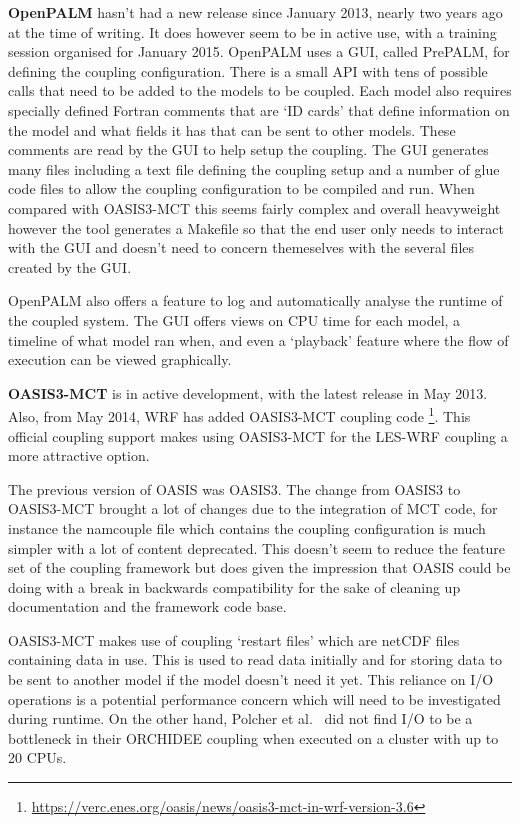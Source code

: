 \documentclass{acm_proc_article-sp}
\renewcommand{\_}{\underscore\hspace{0pt}}
\begin{document}
\textbf{OpenPALM} hasn't had a new release since January 2013, nearly two years
ago at the time of writing. It does however seem to be in active use, with a
training session organised for January 2015. OpenPALM uses a GUI, called
PrePALM, for defining the coupling configuration. There is a small API with tens
of possible calls that need to be added to the models to be coupled. Each model
also requires specially defined Fortran comments that are `ID cards' that define
information on the model and what fields it has that can be sent to other
models. These comments are read by the GUI to help setup the coupling. The GUI
generates many files including a text file defining the coupling setup and a
number of glue code files to allow the coupling configuration to be compiled and
run. When compared with OASIS3-MCT this seems fairly complex and overall
heavyweight however the tool generates a Makefile so that the end user only
needs to interact with the GUI and doesn't need to concern themeselves with the
several files created by the GUI.

OpenPALM also offers a feature to log and automatically analyse the runtime of
the coupled system. The GUI offers views on CPU time for each model, a timeline
of what model ran when, and even a `playback' feature where the flow of
execution can be viewed graphically.

\textbf{OASIS3-MCT} is in active development, with the latest release in May
2013. Also, from May 2014, WRF has added OASIS3-MCT coupling code
\footnote{\url{https://verc.enes.org/oasis/news/oasis3-mct-in-wrf-version-3.6}}.
This official coupling support makes using OASIS3-MCT for the LES-WRF coupling a
more attractive option.

The previous version of OASIS was OASIS3. The change from OASIS3 to OASIS3-MCT
brought a lot of changes due to the integration of MCT code, for instance the
namcouple file which contains the coupling configuration is much simpler with a
lot of content deprecated. This doesn't seem to reduce the feature set of the
coupling framework but does given the impression that OASIS could be doing with
a break in backwards compatibility for the sake of cleaning up documentation and
the framework code base.

OASIS3-MCT makes use of coupling `restart files' which are netCDF files
containing data in use. This is used to read data initially and for storing data
to be sent to another model if the model doesn't need it yet. This reliance on
I/O operations is a potential performance concern which will need to be
investigated during runtime. On the other hand, Polcher et al.\
\cite{Polcher2013} did not find I/O to be a bottleneck in their ORCHIDEE
coupling when executed on a cluster with up to 20 CPUs.
\end{document}
